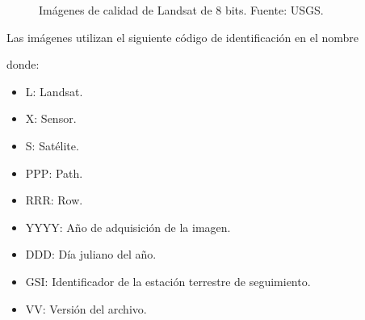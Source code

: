 \begin{figure}
	\centering
	\caption[Imágenes de calidad de Landsat]{Imágenes de calidad de Landsat de 8 bits. Fuente: USGS.}
	\label{fig:imagenescalidad}
\end{figure}

Las imágenes utilizan el siguiente código de identificación en el nombre \citep{Ariza2013} \citep{USGS2015}

\begin{center}
\end{center}

donde:

\begin{itemize}
	\item L: Landsat.
	\item X: Sensor.
	\item S: Satélite.
	\item PPP: Path.
	\item RRR: Row.
	\item YYYY: Año de adquisición de la imagen.
	\item DDD: Día juliano del año.
	\item GSI: Identificador de la estación terrestre de seguimiento.
	\item VV: Versión del archivo.
\end{itemize}

